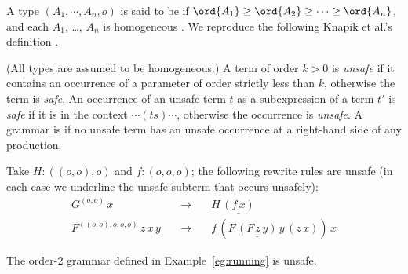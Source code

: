 A type $(A_1, \cdots, A_n, o)$ is said to be  if
$\ord{A_1} \geq \ord{A_2}\geq \cdots \geq \ord{A_n}$, and each $A_1$,
\ldots, $A_n$ is homogeneous \cite{KNU02}.  We reproduce the following
Knapik et al.'s definition \cite{KNU02}.

\begin{definition}\rm
\label{def:safegrammar}
  (All types are assumed to be homogeneous.) A term of order $k > 0$
  is \emph{unsafe} if it contains an occurrence of a parameter of
  order strictly less than $k$, otherwise the term is \emph{safe}. An
  occurrence of an unsafe term $t$ as a subexpression of a term $t'$
  is \emph{safe} if it is in the context $\cdots (ts) \cdots$,
  otherwise the occurrence is \emph{unsafe}. A grammar is
   if no unsafe term has an unsafe occurrence at a
  right-hand side of any production.
\end{definition}

\begin{example}\begin{inparaenum}[(i)] \item Take $H : ((o, o), o)$ and $f : (o, o, o)$; the
    following rewrite rules are unsafe (in each case we underline the
    unsafe subterm that occurs unsafely):
\[\begin{array}{rll}
G^{(o, o)} \, x & \quad \rightarrow \quad & H \, \underline{(f \, {x})} \\
F^{((o, o), o, o, o)} \, z \, x \, y & \quad \rightarrow \quad & f \, (F \, \underline{(F \, z
\, {y})} \, y \, (z \, x) ) \, x
\end{array}\]
\item The order-2 grammar defined in Example~\ref{eg:running} is
  unsafe.
\end{inparaenum}
\end{example}

